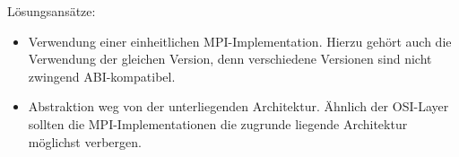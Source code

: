 \documentclass[a4paper,
12pt,
BCOR12mm,
]{scrartcl}
\begin{document}
Lösungsansätze:
\begin{itemize}
	\item Verwendung einer einheitlichen MPI-Implementation. Hierzu gehört auch die
		Verwendung der gleichen Version, denn verschiedene Versionen sind nicht zwingend
		ABI-kompatibel.
	\item Abstraktion weg von der unterliegenden Architektur. Ähnlich der OSI-Layer sollten
	die MPI-Implementationen die zugrunde liegende Architektur möglichst verbergen.
\end{itemize}

%
%
\end{document}
